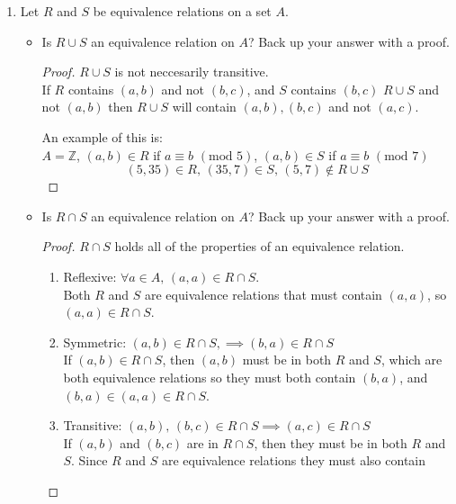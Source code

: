 \documentclass[12pt,a4paper,reqno,parskip=full]{amsart}
\numberwithin{equation}{section}
\theoremstyle{plain}
\theoremstyle{definition}
\begin{document}
\begin{enumerate}
\begin{proof}
        \end{proof}
  \item Let $R$ and $S$ be equivalence relations on a set $A$.
        \begin{itemize}
          \item Is $R\cup S$ an equivalence relation on $A$? Back up your answer with a proof.
                \begin{proof}
                  $R\cup S$ is not neccesarily transitive. \\
                  If $R$ contains $(a,b)$ and not $(b,c)$, and $S$ contains
                  $(b,c)$ $R\cup S$ and not $(a, b)$ then $R\cup S$ will contain
                  $(a,b),(b,c)$ and not $(a,c)$.

                  An example of this is: \\
                  $A=\mathbb{Z}$,
                  $(a,b)\in R$ if $a \equiv b\,\,(\text{mod}\,\,5)$,
                  $(a,b)\in S$ if $a \equiv b\,\,(\text{mod}\,\,7)$
                  \[(5,35)\in R,\,(35,7)\in S,\,(5,7)\notin R\cup S\]
                \end{proof}
          \item Is $R\cap S$ an equivalence relation on $A$? Back up your answer with a proof.
                \begin{proof} $R\cap S$ holds all of the properties of an equivalence relation.
                  \begin{enumerate}[i]
                    \item Reflexive: $\forall a\in A,\,(a,a)\in R\cap S$. \\
                          Both $R$ and $S$ are equivalence relations that must contain $(a,a)$, so
                          $(a,a)\in R\cap S$.
                    \item Symmetric: $(a, b)\in R\cap S,\implies (b, a)\in R\cap S$ \\
                          If $(a,b)\in R\cap S$, then $(a,b)$ must be in both $R$ and $S$, which are
                          both equivalence relations so they must both contain $(b,a)$, and 
                          $(b,a)\in(a,a)\in R\cap S$.
                    \item Transitive: $(a,b),\,(b,c)\in R\cap S\implies (a,c)\in R\cap S$ \\
                          If $(a,b)$ and $(b,c)$ are in $R\cap S$, then they must be in both $R$ and
                          $S$. Since $R$ and $S$ are equivalence relations they must also contain

\end{enumerate}
\end{proof}
\end{itemize}
\end{enumerate}
\end{document}
